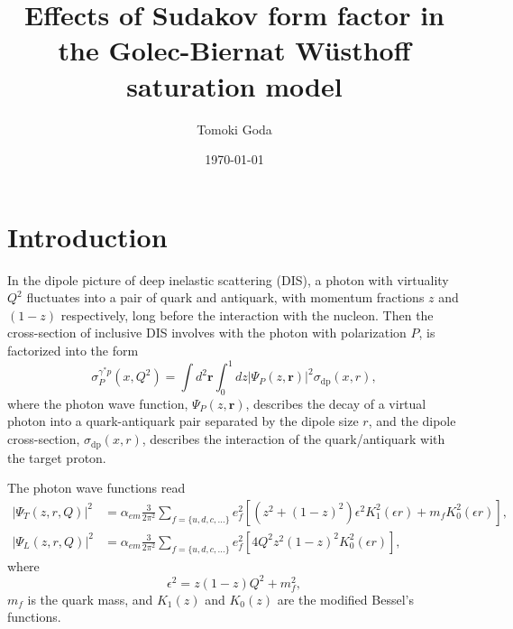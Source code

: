 \documentclass[11pt]{article}
\begin{document}
\author{Tomoki Goda}
\title{ Effects of Sudakov form factor in\\ the
Golec-Biernat W\"usthoff saturation model}
\date{\today}
\maketitle



\begin{abstract}

\end{abstract}

\section{Introduction}


In the dipole picture of deep inelastic scattering (DIS), a photon with virtuality $Q^2$ fluctuates into a pair of quark and antiquark, with momentum fractions $z$ and $(1-z)$ respectively, long before the interaction with the nucleon. Then the cross-section of inclusive DIS involves with the photon with polarization $P$, is factorized into the form \cite{gbw1998}%
\begin{equation}
\sigma^{\gamma^* p}_{P}(x,Q^2)=\int d^2 \mathbf{r} \int^1_0 dz |\Psi_{P}(z,\mathbf{r})|^2 \sigma_{\mathrm{dp}}(x,r),
\label{eq:factorization}
\end{equation}
where the photon wave function, $\Psi_P(z, \mathbf{r}) $, describes the decay of a virtual photon into a quark-antiquark pair separated by the dipole size $r$, and the dipole cross-section, $\sigma_{\mathrm{dp}}(x,r)$, describes the interaction of the quark/antiquark with the target proton. 

The photon wave functions read  \cite{gbw1998}%
\begin{align}
|\Psi_{T}(z,r,Q)|^2 & =\alpha_{em}\frac{3}{2\pi^2}\sum_{f=\{u,d,c,\dots\}} e^2_f \left[ (z^2+(1-z)^2) \epsilon^2 K_1^2(\epsilon r) +m_f K_0^2(\epsilon r) \right],\\
|\Psi_{L}(z,r,Q)|^2 & =\alpha_{em}\frac{3}{2\pi^2}\sum_{f=\{u,d,c,\dots\}} e^2_f \left[ 4Q^2 z^2(1-z)^2 K_0^2(\epsilon r)
\right],
\end{align}
where 
\begin{equation}
\epsilon^2 =z(1-z) Q^2 +m_f^2,
\end{equation}
$m_f$ is the quark mass,
and $K_1(z)$ and $K_0(z)$ are the modified Bessel's functions.
\end{document}
